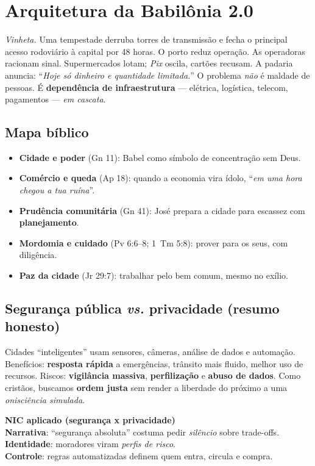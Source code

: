 \chapter{Arquitetura da Babilônia 2.0}
\noindent\textit{Vinheta.} Uma tempestade derruba torres de transmissão e fecha o principal acesso rodoviário à capital por 48 horas. O porto reduz operação. As operadoras racionam sinal. Supermercados lotam; \textit{Pix} oscila, cartões recusam. A padaria anuncia: ``\emph{Hoje só dinheiro e quantidade limitada.}'' O problema \emph{não} é maldade de pessoas. É \textbf{dependência de infraestrutura} --- elétrica, logística, telecom, pagamentos --- \emph{em cascata}.

\section{Mapa bíblico}
\begin{itemize}[leftmargin=*,noitemsep]
  \item \textbf{Cidade e poder} (Gn 11): Babel como símbolo de concentração sem Deus.
  \item \textbf{Comércio e queda} (Ap 18): quando a economia vira ídolo, ``\emph{em uma hora chegou a tua ruína}''.
  \item \textbf{Prudência comunitária} (Gn 41): José prepara a cidade para escassez com \textbf{planejamento}.
  \item \textbf{Mordomia e cuidado} (Pv 6:6--8; 1~Tm 5:8): prover para os seus, com diligência.
  \item \textbf{Paz da cidade} (Jr 29:7): trabalhar pelo bem comum, mesmo no exílio.
\end{itemize}

\section{Segurança pública \emph{vs.} privacidade (resumo honesto)}
Cidades ``inteligentes'' usam sensores, câmeras, análise de dados e automação. Benefícios: \textbf{resposta rápida} a emergências, trânsito mais fluido, melhor uso de recursos. Riscos: \textbf{vigilância massiva}, \textbf{perfilização} e \textbf{abuso de dados}. Como cristãos, buscamos \textbf{ordem justa} sem render a liberdade do próximo a uma \emph{onisciência simulada}.

\begin{nicbox}
\textbf{NIC aplicado (segurança x privacidade)}\\
\textbf{Narrativa}: ``segurança absoluta'' costuma pedir \emph{silêncio} sobre trade-offs.\\
\textbf{Identidade}: moradores viram \emph{perfis de risco}.\\
\textbf{Controle}: regras automatizadas definem quem entra, circula e compra.
\end{nicbox}


